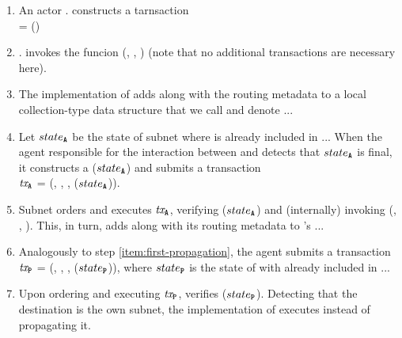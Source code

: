 \begin{enumerate}

    \item An actor . constructs a tarnsaction\\
     = ()

    \item {}. invokes the funcion (, , )
    (note that no additional transactions are necessary here).

    \item The implementation of  adds  along with the routing metadata to a local collection-type data structure
    that we call \postoffice and denote .\gw.\dataField{\postoffice}.

    \item \label{item:first-propagation} Let $state_{\textbf{\texttt{A}}}$ be the state of subnet  where  is already included in .\gw.\dataField{\postoffice}.
    When the \ipc agent responsible for the interaction between  and  detects that $state_{\textbf{\texttt{A}}}$ is final,
    it constructs a {\pof}($state_{\textbf{\texttt{A}}}$) and submits a transaction\\
    $\textit{tx}_{\textbf{\texttt{A}}}$ = (, , , {\pof}($state_{\textbf{\texttt{A}}}$)).

    \item Subnet  orders and executes $\textit{tx}_{\textbf{\texttt{A}}}$, verifying {\pof}($state_{\textbf{\texttt{A}}}$)
    and (internally) invoking (, , ).
    This, in turn, adds  along with its routing metadata to 's \postoffice {}.\gw.\dataField{\postoffice}.

    \item Analogously to step \ref{item:first-propagation}, the \ipc agent submits a transaction\\
    $\textit{tx}_{\textbf{\texttt{P}}}$ = (, , , {\pof}($state_{\textbf{\texttt{P}}}$)),
    where $state_{\textbf{\texttt{P}}}$ is the state of  with  already included in .\gw.\dataField{\postoffice}.

    \item Upon ordering and executing $\textit{tx}_{\textbf{\texttt{P}}}$,  verifies {\pof}($state_{\textbf{\texttt{P}}}$).
    Detecting that the destination is the own subnet, the implementation of  executes  instead of propagating it.

\end{enumerate}

